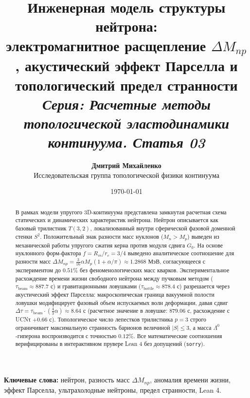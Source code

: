 \documentclass[11pt,a4paper]{article}
\theoremstyle{definition}
\theoremstyle{remark}
\begin{document}
\title{\textbf{\Large Инженерная модель структуры нейтрона:}\\
\large электромагнитное расщепление $\Delta M_{np}$, акустический эффект Парселла и топологический предел странности\\[2mm]
\normalsize \textit{Серия: Расчетные методы топологической эластодинамики континуума. Статья 03}}

\author{\textbf{Дмитрий Михайленко}\\[1mm]
\small Исследовательская группа топологической физики континуума}

\date{\today}

\maketitle

\begin{abstract}
\noindent В рамках модели упругого 3D-континуума представлена замкнутая расчетная схема статических и динамических характеристик нейтрона. Нейтрон описывается как базовый трилистник $T(3,2)$, локализованный внутри сферической фазовой доменной стенки $S^2$. Положительный знак разности масс нуклонов ($M_n > M_p$) выведен из механической работы упругого сжатия керна против модуля сдвига $G_0$. На основе нуклонного форм-фактора $f = R_m / r_c = 3/4$ выведено аналитическое соотношение для разности масс $\Delta M_{np} = \frac{3}{16}\alpha M_p (1 + \alpha/\pi) \approx 1.2868\text{ МэВ}$, согласующееся с экспериментом до $0.51\%$ без феноменологических масс кварков. Экспериментальное расхождение времени жизни свободного нейтрона между пучковым методом ($\tau_{\mathrm{beam}} \approx 887.7\text{ с}$) и гравитационными ловушками ($\tau_{\mathrm{bottle}} \approx 878.4\text{ с}$) разрешается через акустический эффект Парселла: макроскопическая граница вакуумной полости ловушки модифицирует фазовый объем испускаемых волн деформации, давая сдвиг $\Delta \tau = \tau_{\mathrm{beam}} \cdot (\frac{4}{3}\alpha) \approx 8.64\text{ с}$ (расчетное значение в ловушке: $879.06\text{ с}$, расхождение с UCNτ $+0.66\text{ с}$). Топологическое число лепестков трилистника $p=3$ строго ограничивает максимальную странность барионов величиной $|S| \le 3$, а масса $\Lambda^0$-гиперона воспроизводится с точностью $0.12\%$. Все математические соотношения верифицированы в интерактивном прувере Lean 4 без допущений (\texttt{sorry}).
\end{abstract}

\vspace{2mm}
\noindent\textbf{Ключевые слова:} нейтрон, разность масс $\Delta M_{np}$, аномалия времени жизни, эффект Парселла, ультрахолодные нейтроны, предел странности, Lean 4.
\end{document}
